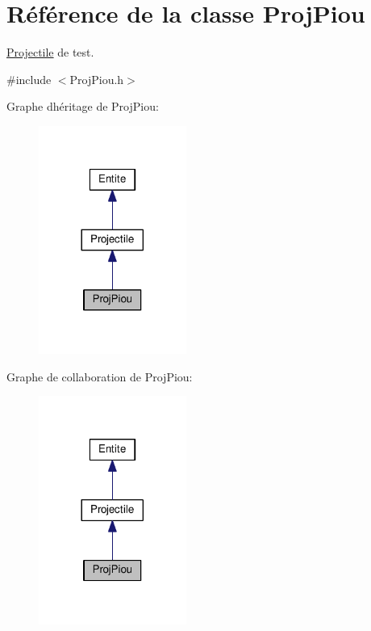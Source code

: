 \hypertarget{class_proj_piou}{}\section{Référence de la classe Proj\+Piou}
\label{class_proj_piou}


\hyperlink{class_projectile}{Projectile} de test.  




{\ttfamily \#include $<$Proj\+Piou.\+h$>$}



Graphe d\textquotesingle{}héritage de Proj\+Piou\+:\nopagebreak
\begin{figure}[H]
\begin{center}
\leavevmode
\includegraphics[width=137pt]{class_proj_piou__inherit__graph}
\end{center}
\end{figure}


Graphe de collaboration de Proj\+Piou\+:\nopagebreak
\begin{figure}[H]
\begin{center}
\leavevmode
\includegraphics[width=137pt]{class_proj_piou__coll__graph}
\end{center}
\end{figure}
